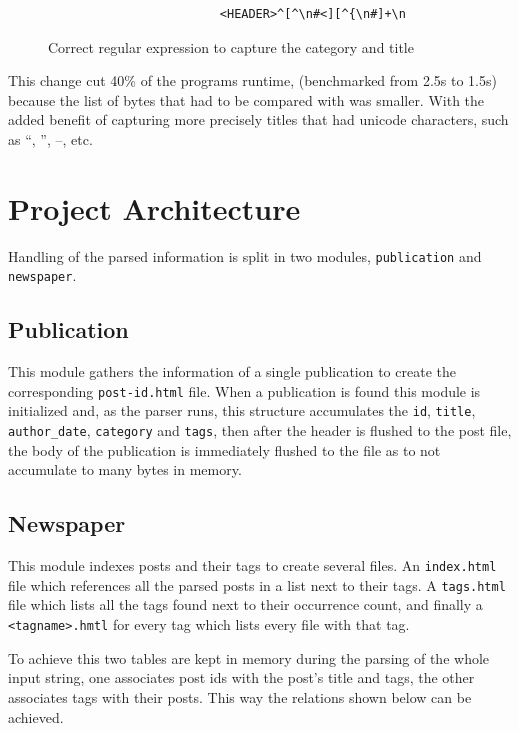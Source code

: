 \documentclass[a4paper]{article}
\begin{document}
\begin{figure}[H]
    \centering
    \begin{verbatim}
                        <HEADER>^[^\n#<][^{\n#]+\n
    \end{verbatim}
    \caption{Correct regular expression to capture the category and title}
\end{figure}

This change cut 40\% of the programs runtime, (benchmarked from 2.5s to 1.5s)
because the list of bytes that had to be compared with was smaller. With the
added benefit of capturing more precisely titles that had unicode characters,
such as  ``,  '', --, etc.

\section{Project Architecture}

Handling of the parsed information is split in two modules,
\texttt{publication} and \texttt{newspaper}.

\subsection{Publication}

This module gathers the information of a single publication to create the
corresponding \texttt{post-id.html} file. When a publication is found this
module is initialized and, as the parser runs, this structure accumulates the
\texttt{id}, \texttt{title}, \texttt{author\_date}, \texttt{category} and
\texttt{tags}, then after the header is flushed to the post file, the body of
the publication is immediately flushed to the file as to not accumulate to many
bytes in memory.

\subsection{Newspaper}

This module indexes posts and their tags to create several files. An
\texttt{index.html} file which references all the parsed posts in a list next
to their tags. A \texttt{tags.html} file which lists all the tags found next to
their occurrence count, and finally a \texttt{<tagname>.hmtl} for every tag
which lists every file with that tag.

To achieve this two tables are kept in memory during the parsing of the whole
input string, one associates post ids with the post's title and tags, the other
associates tags with their posts. This way the relations shown below can be
achieved.
\end{document}
